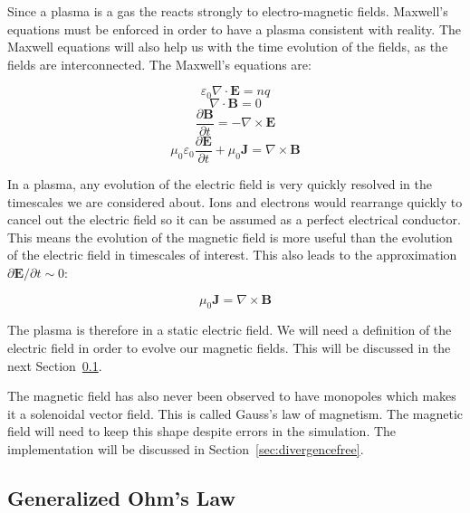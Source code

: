 \documentclass[12pt,upcase]{umlthesis}
\begin{document}
Since a plasma is a gas the reacts strongly to electro-magnetic fields. Maxwell's equations must be enforced in order to have a plasma consistent with reality. The Maxwell equations will also help us with the time evolution of the fields, as the fields are interconnected. The Maxwell's equations are:

\begin{equation}\label{eq:gausslaw}
	\varepsilon_0\nabla\cdot\textbf{E} = n q
\end{equation}
\begin{equation}\label{eq:maggausslaw}
	\nabla\cdot\textbf{B} = 0
\end{equation}
\begin{equation}\label{eq:lawofinduction}
	\frac{\partial\textbf{B}}{\partial t} = - \nabla\times\textbf{E}
\end{equation}
\begin{equation}\label{eq:ampereslaw}
	\mu_0\varepsilon_0\frac{\partial\textbf{E}}{\partial t} + \mu_0\textbf{J} = \nabla\times\textbf{B}
\end{equation}

In a plasma, any evolution of the electric field is very quickly resolved in the timescales we are considered about. Ions and electrons would rearrange quickly to cancel out the electric field so it can be assumed as a perfect electrical conductor. This means the evolution of the magnetic field is more useful than the evolution of the electric field in timescales of interest. This also leads to the approximation $\partial\textbf{E}/\partial t \sim 0$:

\begin{equation}\label{eq:ampereslawapprox}
	\mu_0\textbf{J} = \nabla\times\textbf{B}
\end{equation}

The plasma is therefore in a static electric field. We will need a definition of the electric field in order to evolve our magnetic fields. This will be discussed in the next Section~\ref{sec:ohmslaw}.

The magnetic field has also never been observed to have monopoles which makes it a solenoidal vector field. This is called Gauss's law of magnetism. The magnetic field will need to keep this shape despite errors in the simulation. The implementation will be discussed in Section~\ref{sec:divergencefree}.

\subsection{Generalized Ohm's Law}\label{sec:ohmslaw}
\end{document}

